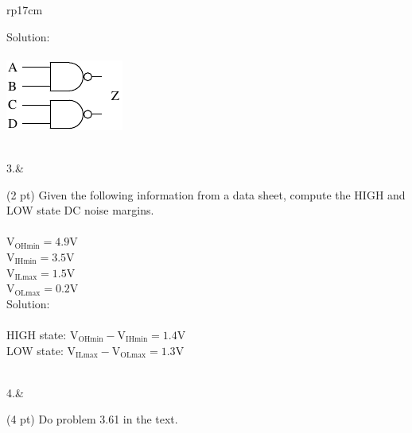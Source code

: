 \documentclass{article}
\begin{document}
\begin{longtable}[l]{rp{17cm}}
\begin{minipage}[t]{\linewidth}
Solution: \\ \\
\includegraphics{../CMOSCircuits/Assessments/NANDNAND}
\end{minipage}\\
\medskip
3.&\begin{minipage}[t]{\linewidth}(2 pt) Given the following information from a data sheet, compute the HIGH and LOW state DC noise margins.\\ \\
$\textrm{V}_{\textrm{OHmin}} = 4.9 \textrm{V}$\\
$\textrm{V}_{\textrm{IHmin}} = 3.5 \textrm{V}$\\
$\textrm{V}_{\textrm{ILmax}} = 1.5 \textrm{V}$\\
$\textrm{V}_{\textrm{OLmax}} = 0.2 \textrm{V}$\\

Solution: \\ \\
HIGH state: $\textrm{V}_{\textrm{OHmin}} - \textrm{V}_{\textrm{IHmin}} = 1.4 \textrm{V}$\\
LOW state: $\textrm{V}_{\textrm{ILmax}} - \textrm{V}_{\textrm{OLmax}} = 1.3 \textrm{V}$\\
\end{minipage}\\
\medskip
4.&\begin{minipage}[t]{\linewidth}(4 pt) Do problem 3.61 in the text.\\ \\


\end{minipage}
\end{longtable}
\end{document}
